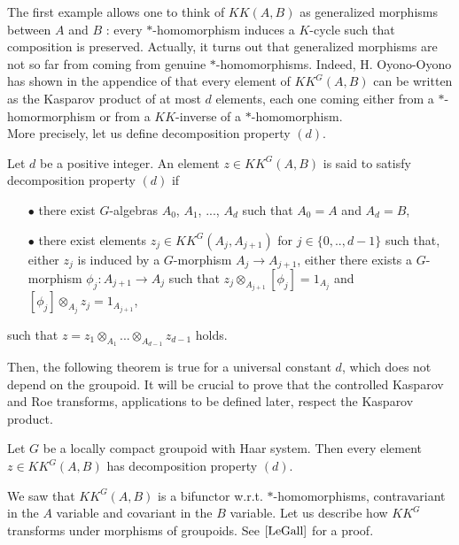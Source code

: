 The first example allows one to think of $KK(A,B)$ as generalized morphisms between $A$ and $B$ : every $*$-homomorphism induces a $K$-cycle such that composition is preserved. Actually, it turns out that generalized morphisms are not so far from coming from genuine $*$-homomorphisms. Indeed, H. Oyono-Oyono has shown in the appendice of \cite{LaffOY} that every element of $KK^G(A,B)$ can be written as the Kasparov product of at most $d$ elements, each one coming either from a $*$-homormorphism or from a $KK$-inverse of a $*$-homomorphism.\\


More precisely, let us define decomposition property $(d)$.

\begin{definition}
Let $d$ be a positive integer. An element $z\in KK^G(A,B)$ is said to satisfy decomposition property $(d)$ if
\begin{itemize}
\item[$\bullet$] there exist $G$-algebras $A_0$, $A_1$, ..., $A_d$ such that $A_0=A$ and $A_d=B$, 
\item[$\bullet$] there exist elements $z_j \in KK^G(A_{j},A_{j+1})$ for $j\in\{0,..,d-1\}$ such that, either $z_j$ is induced by a $G$-morphism $A_j \rightarrow A_{j+1}$, either there exists a $G$-morphism $\phi_j : A_{j+1}\rightarrow A_j$ such that $z_j \otimes_{A_{j+1}} [\phi_j] = 1_{A_j}$ and $ [\phi_j] \otimes_{A_{j}} z_j  = 1_{A_{j+1}}$,
\end{itemize}
such that $z = z_1 \otimes_{A_1}  ... \otimes_{A_{d-1}} z_{d-1} $ holds.
\end{definition}

Then, the following theorem is true for a universal constant $d$, which does not depend on the groupoid. It will be crucial to prove that the controlled Kasparov and Roe transforms, applications to be defined later, respect the Kasparov product. 

\begin{thm}\label{propertyD}
Let $G$ be a locally compact groupoid with Haar system. Then every element $z\in KK^G(A,B)$ has decomposition property $(d)$.
\end{thm}

We saw that $KK^G(A,B)$ is a bifunctor w.r.t. $*$-homomorphisms, contravariant in the $A$ variable and covariant in the $B$ variable. Let us describe how $KK^G$ transforms under morphisms of groupoids. See $\cite{LeGall}$ for a proof.

